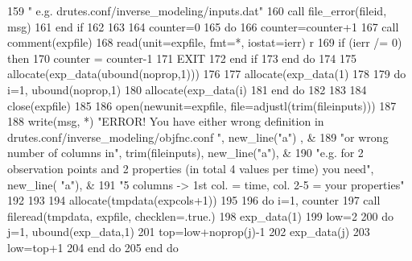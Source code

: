 \begin{DoxyCode}
159 \textcolor{comment}{        }\textcolor{stringliteral}{" e.g. drutes.conf/inverse\_modeling/inputs.dat"}
160         \textcolor{keyword}{call }file_error(fileid, msg)
161 \textcolor{keywordflow}{      end if}
162       
163       
164       counter=0
165       \textcolor{keywordflow}{do} 
166         counter=counter+1
167         \textcolor{keyword}{call }comment(expfile)
168         \textcolor{keyword}{read}(unit=expfile, fmt=*, iostat=ierr) r
169         \textcolor{keywordflow}{if} (ierr /= 0) \textcolor{keywordflow}{then}
170           counter = counter-1
171           \textcolor{keywordflow}{EXIT}
172 \textcolor{keywordflow}{        end if}
173 \textcolor{keywordflow}{      end do}
174       
175       \textcolor{keyword}{allocate}(exp\_data(ubound(noprop,1)))
176       
177       \textcolor{keyword}{allocate}(exp\_data(1)%
178       
179       \textcolor{keywordflow}{do} i=1, ubound(noprop,1)
180         \textcolor{keyword}{allocate}(exp\_data(i)%
181 \textcolor{keywordflow}{      end do}
182       
183       
184       \textcolor{keyword}{close}(expfile)
185        
186       \textcolor{keyword}{open}(newunit=expfile, file=adjustl(trim(fileinputs)))
187       
188       \textcolor{keyword}{write}(msg, *) \textcolor{stringliteral}{"ERROR! You have either wrong definition in drutes.conf/inverse\_modeling/objfnc.conf "}\textcolor{comment}{,
       new\_line(}\textcolor{stringliteral}{"a"}\textcolor{comment}{) , &}
189 \textcolor{comment}{        }\textcolor{stringliteral}{"or wrong number of columns in"}, trim(fileinputs), new\_line(\textcolor{stringliteral}{"a"})\textcolor{comment}{, &}
190 \textcolor{comment}{        }\textcolor{stringliteral}{"e.g. for 2 observation points and 2 properties (in total 4 values per time) you need"}\textcolor{comment}{, new\_line(}\textcolor{stringliteral}{
      "a"}\textcolor{comment}{), &}
191 \textcolor{comment}{        }\textcolor{stringliteral}{"5 columns -> 1st col. = time, col. 2-5  = your properties"}
192         
193         
194       \textcolor{keyword}{allocate}(tmpdata(expcols+1))
195       
196       \textcolor{keywordflow}{do} i=1, counter     
197         \textcolor{keyword}{call }fileread(tmpdata, expfile, checklen=.true.)
198         exp\_data(1)%
199         low=2
200         \textcolor{keywordflow}{do} j=1, ubound(exp\_data,1)
201           top=low+noprop(j)-1
202           exp\_data(j)%
203           low=top+1
204 \textcolor{keywordflow}{        end do}  
205 \textcolor{keywordflow}{      end do}

\end{DoxyCode}
